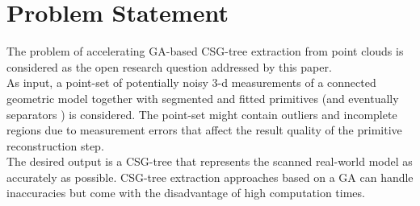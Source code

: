 \section{Problem Statement}
\label{sec:prob}
The problem of accelerating \ac{GA}-based \ac{CSG}-tree extraction from point clouds is considered as the open research question addressed by this paper.
\\
As input, a point-set of potentially noisy $3$-d measurements of a connected geometric model together with segmented and fitted primitives 
(and eventually separators \cite{shapiro1993separation}) 
is considered. 
The point-set might contain outliers and incomplete regions due to measurement errors that affect the result quality of the primitive reconstruction step.
\\
The desired output is a \ac{CSG}-tree that represents the scanned real-world model as accurately as possible.
\ac{CSG}-tree extraction approaches based on a \ac{GA} \cite{fayolle2016evolutionary} can handle 
inaccuracies but come with the disadvantage of high computation times.
